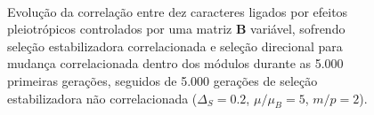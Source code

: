 \begin{figure}[htbp]
    \vspace{-18pt}
    \vspace{11pt}
    \\
    \caption{Evolução da correlação entre dez caracteres ligados por efeitos
        pleiotrópicos controlados por uma matriz $\mathbf{B}$ variável, sofrendo
        seleção estabilizadora correlacionada e seleção direcional para
        mudança correlacionada dentro dos módulos durante as 5.000
        primeiras gerações, seguidos de 5.000 gerações de seleção
        estabilizadora não correlacionada ($\Delta_S = 0.2$, $\mu/\mu_B=5$,
    $m/p=2$).}
    \label{posselecaoSemEstab}
\end{figure}



